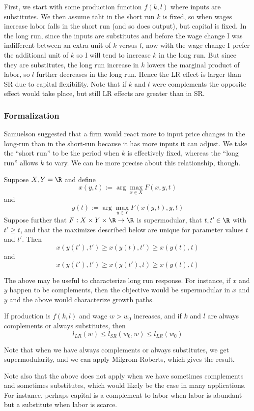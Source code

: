 First, we start with some production function $f(k, l)$ where inputs
are substitutes. We then assume taht in the short run $k$ is fixed, so
when wages increase labor falls in the short run (and so does output),
but capital is fixed. In the long run, since the inputs are
substitutes and before the wage change I was indifferent between an
extra unit of $k$ versus $l$, now with the wage change I prefer the
additional unit of $k$ so I will tend to increase $k$ in the long
run. But since they are substitutes, the long run increase in $k$
lowers the marginal product of labor, so $l$ further decreases in the
long run. Hence the LR effect is larger than SR due to capital
flexibility. Note that if $k$ and $l$ were complements the opposite
effect would take place, but still LR effects are greater than in SR.


\subsubsection{Formalization}



Samuelson suggested that a firm would react more to input price
changes in the long-run than in the short-run because it has more
inputs it can adjust. We take the ``short run'' to be the period when
$k$ is effectively fixed, whereas the ``long run'' allows $k$ to
vary. We can be more precise about this relationship, though.

\begin{prop}
  Suppose $X, Y = \R$ and define
  \[
  x(y, t) := \arg \max_{x \in X} F(x,y,t)
  \]
  and
  \[
  y(t) := \arg \max_{y \in Y} F(x(y, t), y, t)
  \]
  Suppose further that $F: X \times Y \times \R \to \R$ is
  supermodular, that $t, t' \in \R $ with $t' \geq t$, and that the
  maximizes described below are unique for parameter values $t$ and
  $t'$. Then
  \[
  x(y(t'), t') \geq x(y(t), t') \geq x(y(t), t)
  \]
  and
  \[
  x(y(t'), t') \geq x(y(t'), t) \geq x(y(t), t)
  \]
\end{prop}

The above may be useful to characterize long run response. For
instance, if $x$ and $y$ happen to be complements, then the objective
would be supermodular in $x$ and $y$ and the above would characterize
growth paths.

\begin{prop}
  If production is $f(k,l)$ and wage $w > w_0$ increases, and if $k$
  and $l$ are always complements or always substitutes, then
  \[
  l_{LR}(w) \leq l_{SR}(w_0, w) \leq l_{LR}(w_0)
  \]
\end{prop}

Note that when we have always complements or always substitutes, we
get supermodularity, and we can apply Milgrom-Roberts, which gives the
result.

Note also that the above does not apply when we have sometimes complements
and sometimes substitutes, which would likely be the case in many
applications. For instance, perhaps capital is a complement to labor
when labor is abundant but a substitute when labor is scarce.


